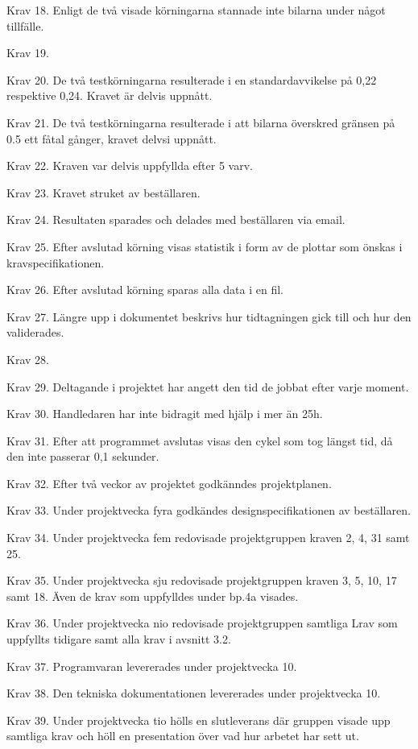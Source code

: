 Krav 18. Enligt de två visade körningarna stannade inte bilarna under något
tillfälle. 

Krav 19. 

Krav 20. De två testkörningarna resulterade i en standardavvikelse på 0,22
respektive 0,24. Kravet är delvis uppnått. 

Krav 21. De två testkörningarna resulterade i att bilarna överskred gränsen på
0.5 ett fåtal gånger, kravet delvsi uppnått. 

Krav 22. Kraven var delvis uppfyllda efter 5 varv. 

Krav 23. Kravet struket av beställaren. 

Krav 24. Resultaten sparades och delades med beställaren via email.  

Krav 25. Efter avslutad körning visas statistik i form av de plottar som önskas
i kravspecifikationen. 

Krav 26. Efter avslutad körning sparas alla data i en fil.  

Krav 27. Längre upp i dokumentet beskrivs hur tidtagningen gick till och hur den
validerades.

Krav 28. 

Krav 29. Deltagande i projektet har angett den tid de jobbat efter varje moment. 

Krav 30. Handledaren har inte bidragit med hjälp i mer än 25h.

Krav 31. Efter att programmet avslutas visas den cykel som tog längst tid, då
den inte passerar 0,1 sekunder. 

Krav 32. Efter två veckor av projektet godkänndes projektplanen. 

Krav 33. Under projektvecka fyra godkändes designspecifikationen av beställaren. 

Krav 34. Under projektvecka fem redovisade projektgruppen kraven 2, 4, 31 samt 25. 

Krav 35. Under projektvecka sju redovisade projektgruppen kraven 3, 5, 10, 17
samt 18. Även de krav som uppfylldes under bp.4a visades. 

Krav 36. Under projektvecka nio redovisade projektgruppen samtliga Lrav som
uppfyllts tidigare samt alla krav i avsnitt 3.2.

Krav 37. Programvaran levererades under projektvecka 10. 

Krav 38. Den tekniska dokumentationen levererades under projektvecka 10. 

Krav 39. Under projektvecka tio hölls en slutleverans där gruppen visade upp
samtliga krav och höll en presentation över vad hur arbetet har sett ut. 

